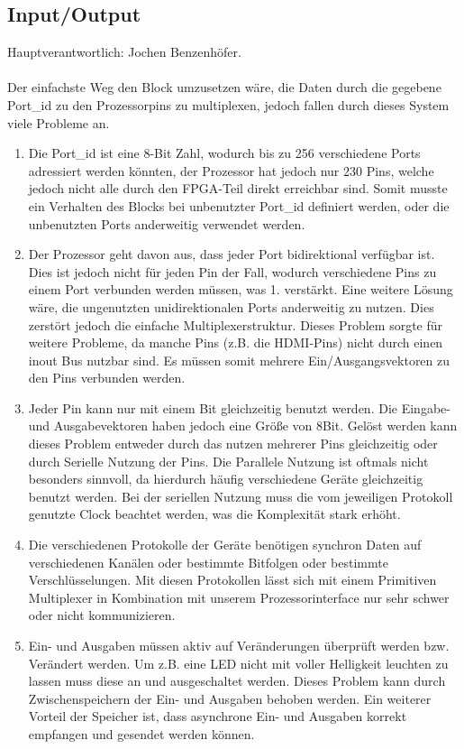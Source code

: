 \documentclass[bibliography=totoc,listof=totoc,index=totoc]{scrartcl}
\begin{document}
\subsection{Input/Output}
Hauptverantwortlich: Jochen Benzenhöfer.\\\\
Der einfachste Weg den Block umzusetzen wäre, die Daten durch die gegebene Port\_id zu den Prozessorpins zu multiplexen, jedoch fallen durch dieses System viele Probleme an.
\begin{enumerate}
    \item 
    Die Port\_id ist eine 8-Bit Zahl, wodurch bis zu 256 verschiedene Ports adressiert werden könnten, der Prozessor hat jedoch nur 230 Pins, welche jedoch nicht alle durch den FPGA-Teil direkt erreichbar sind. Somit musste ein Verhalten des Blocks bei unbenutzter Port\_id definiert werden, oder die unbenutzten Ports anderweitig verwendet werden.
    \item
    Der Prozessor geht davon aus, dass jeder Port bidirektional verfügbar ist. Dies ist jedoch nicht für jeden Pin der Fall, wodurch verschiedene Pins zu einem Port verbunden werden müssen, was 1. verstärkt. Eine weitere Lösung wäre, die ungenutzten unidirektionalen Ports anderweitig zu nutzen. Dies zerstört jedoch die einfache Multiplexerstruktur. Dieses Problem sorgte für weitere Probleme, da manche Pins (z.B. die HDMI-Pins) nicht durch einen inout Bus nutzbar sind. Es müssen somit mehrere Ein/Ausgangsvektoren zu den Pins verbunden werden.
    \item
    Jeder Pin kann nur mit einem Bit gleichzeitig benutzt werden. Die Eingabe- und Ausgabevektoren haben jedoch eine Größe von 8Bit. Gelöst werden kann dieses Problem entweder durch das nutzen mehrerer Pins gleichzeitig oder durch Serielle Nutzung der Pins. Die Parallele Nutzung ist oftmals nicht besonders sinnvoll, da hierdurch häufig verschiedene Geräte gleichzeitig benutzt werden. Bei der seriellen Nutzung muss die vom jeweiligen Protokoll genutzte Clock beachtet werden, was die Komplexität stark erhöht.
    \item
    Die verschiedenen Protokolle der Geräte benötigen synchron Daten auf verschiedenen Kanälen oder bestimmte Bitfolgen oder bestimmte Verschlüsselungen. Mit diesen Protokollen lässt sich mit einem Primitiven Multiplexer in Kombination mit unserem Prozessorinterface nur sehr schwer oder nicht kommunizieren.
    \item
    Ein- und Ausgaben müssen aktiv auf Veränderungen überprüft werden bzw. Verändert werden. Um z.B. eine LED nicht mit voller Helligkeit leuchten zu lassen muss diese an und ausgeschaltet werden. Dieses Problem kann durch Zwischenspeichern der Ein- und Ausgaben behoben werden. Ein weiterer Vorteil der Speicher ist, dass asynchrone Ein- und Ausgaben korrekt empfangen und gesendet werden können.
\end{enumerate}
\end{document}
